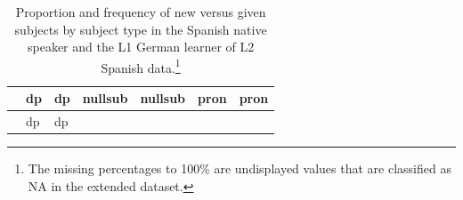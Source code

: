 \documentclass[
  letterpaper,
  DIV=11,
  numbers=noendperiod]{scrartcl}
\begin{document}
\begin{longtable}[]{@{}
  >{\raggedright\arraybackslash}p{}
  >{\centering\arraybackslash}p{}
  >{\centering\arraybackslash}p{}
  >{\centering\arraybackslash}p{}
  >{\centering\arraybackslash}p{}
  >{\centering\arraybackslash}p{}
  >{\centering\arraybackslash}p{}@{}}
\caption[Proportion and frequency of new versus given subjects by
subject type in the Spanish native speaker and the L1 German learner of
L2 Spanish data.]{Proportion and frequency of new versus given subjects
by subject type in the Spanish native speaker and the L1 German learner
of L2 Spanish data.\footnote{The missing percentages to 100\% are
  undisplayed values that are classified as NA in the extended dataset.}}\label{tbl-info-structure}\tabularnewline
\toprule\noalign{}
\begin{minipage}[b]{\linewidth}\raggedright
\end{minipage} & \begin{minipage}[b]{\linewidth}\centering
dp
\end{minipage} & \begin{minipage}[b]{\linewidth}\centering
dp
\end{minipage} & \begin{minipage}[b]{\linewidth}\centering
nullsub
\end{minipage} & \begin{minipage}[b]{\linewidth}\centering
nullsub
\end{minipage} & \begin{minipage}[b]{\linewidth}\centering
pron
\end{minipage} & \begin{minipage}[b]{\linewidth}\centering
pron
\end{minipage} \\
\midrule\noalign{}
\endfirsthead
\toprule\noalign{}
\begin{minipage}[b]{\linewidth}\raggedright
\end{minipage} & \begin{minipage}[b]{\linewidth}\centering
dp
\end{minipage} & \begin{minipage}[b]{\linewidth}\centering
dp
\end{minipage} & \begin{minipage}[b]{\linewidth}\centering

\end{minipage}
\end{longtable}
\end{document}
